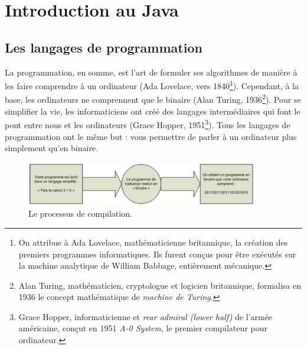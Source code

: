 \documentclass[12pt]{report}
\begin{document}

\chapter{Introduction au Java}
%
%
%
\section{Les langages de programmation}
La programmation, en somme, est l'art de formuler ses algorithmes de manière à les faire comprendre à un ordinateur (Ada Lovelace, vers 1840\footnote{On attribue à Ada Lovelace, mathématicienne britannique, la création des premiers programmes informatiques. Ils furent conçus pour être exécutés sur la machine analytique de William Babbage, entièrement mécanique.}). Cependant, à la base, les ordinateurs ne comprennent que le binaire (Alan Turing, 1936\footnote{Alan Turing, mathématicien, cryptologue et logicien britannique, formalisa en 1936 le concept mathématique de \emph{machine de Turing}.}). Pour se simplifier la vie, les informaticiens ont créé des langages intermédiaires qui font le pont entre nous et les ordinateurs (Grace Hopper, 1951\footnote{Grace Hopper, informaticienne et \emph{rear admiral (lower half)} de l'armée américaine, conçut en 1951 \emph{A-0 System}, le premier compilateur pour ordinateur.}). Tous les langages de programmation ont le même but : vous permettre de parler à un ordinateur plus simplement qu'en binaire.
%
%
%
\begin{figure}[!htbp]
  \centering
  \includegraphics[width=0.9\textwidth]{compilation.png}
  \caption{Le processus de compilation.}
\end{figure}
\end{document}
